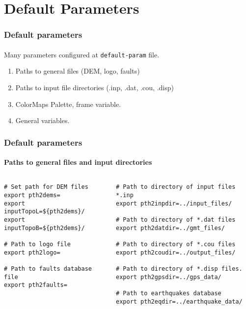 \section[Defaults]{Default Parameters}

\graphicspath{{Chapter3/Figs/Vector/}}

\begin{frame}
  \frametitle{Default parameters}
  \framesubtitle{}
  \label{fr3:frank_tr}
  
Many parameters configured at \texttt{default-param} file. 
\begin{enumerate}
\item  Paths to general files (DEM, logo, faults) 
\item Paths to input file directories (.inp, .dat, .cou, .disp) 
\item ColorMaps Palette, frame variable. 
\item General variables.
\end{enumerate}
\end{frame}
\note{} %

\begin{frame}[t,fragile]
  \frametitle{Default parameters}
  \framesubtitle{Paths to general files and input directories}
  \label{fr3:frank_tr}
\begin{columns}[t]
  \begin{column}{.45\textwidth}
	\begin{scriptsize}
	  \begin{verbatim}
# Set path for DEM files
export pth2dems=
export inputTopoL=${pth2dems}/
export inputTopoB=${pth2dems}/

# Path to logo file
export pth2logo=

# Path to faults database file
export pth2faults=
\end{verbatim}
    \end{scriptsize}
  \end{column}
  \begin{column}{.54\textwidth}
\begin{scriptsize}
	\begin{verbatim}
# Path to directory of input files *.inp
export pth2inpdir=../input_files/

# Path to directory of *.dat files
export pth2datdir=../gmt_files/

# Path to directory of *.cou files
export pth2coudir=../output_files/

# Path to directory of *.disp files.
export pth2gpsdir=../gps_data/

# Path to earthquakes database
export pth2eqdir=../earthquake_data/
\end{verbatim}	  
	\end{scriptsize}
  \end{column}
\end{columns}
\end{frame}
\note{} %

